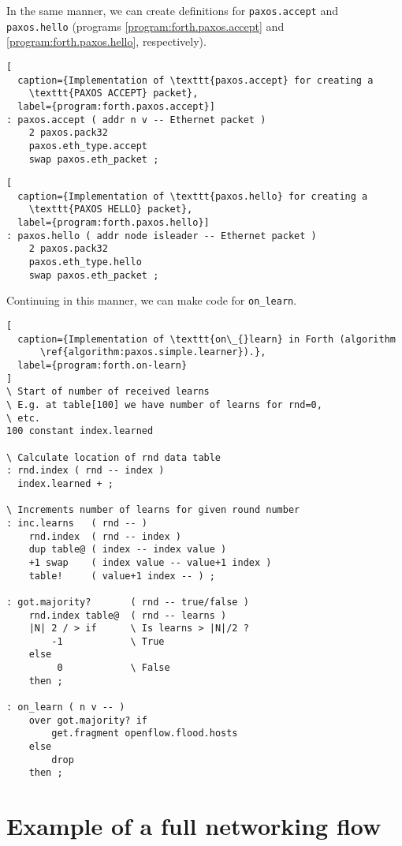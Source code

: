 In the same manner, we can create definitions for \texttt{paxos.accept} and
\texttt{paxos.hello} (programs \ref{program:forth.paxos.accept} and
\ref{program:forth.paxos.hello}, respectively).

\begin{lstlisting}[
  caption={Implementation of \texttt{paxos.accept} for creating a
    \texttt{PAXOS ACCEPT} packet},
  label={program:forth.paxos.accept}]
: paxos.accept ( addr n v -- Ethernet packet )
    2 paxos.pack32
    paxos.eth_type.accept
    swap paxos.eth_packet ;
\end{lstlisting}

\begin{lstlisting}[
  caption={Implementation of \texttt{paxos.hello} for creating a
    \texttt{PAXOS HELLO} packet},
  label={program:forth.paxos.hello}]
: paxos.hello ( addr node isleader -- Ethernet packet )
    2 paxos.pack32
    paxos.eth_type.hello
    swap paxos.eth_packet ;
\end{lstlisting}

Continuing in this manner, we can make code for \texttt{on\_{}learn}.

\begin{lstlisting}[
  caption={Implementation of \texttt{on\_{}learn} in Forth (algorithm
      \ref{algorithm:paxos.simple.learner}).},
  label={program:forth.on-learn}
]
\ Start of number of received learns
\ E.g. at table[100] we have number of learns for rnd=0,
\ etc.
100 constant index.learned

\ Calculate location of rnd data table
: rnd.index ( rnd -- index )
  index.learned + ;

\ Increments number of learns for given round number
: inc.learns   ( rnd -- )
    rnd.index  ( rnd -- index )
    dup table@ ( index -- index value )
    +1 swap    ( index value -- value+1 index )
    table!     ( value+1 index -- ) ;

: got.majority?       ( rnd -- true/false )
    rnd.index table@  ( rnd -- learns )
    |N| 2 / > if      \ Is learns > |N|/2 ?
        -1            \ True
    else
         0            \ False
    then ;

: on_learn ( n v -- )
    over got.majority? if
        get.fragment openflow.flood.hosts
    else
        drop
    then ;
\end{lstlisting}

\section{Example of a full networking flow}

